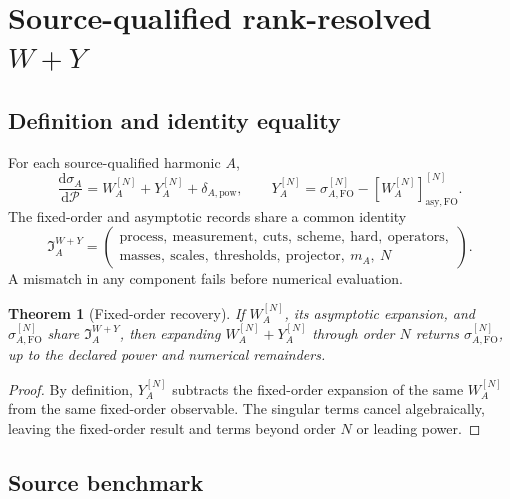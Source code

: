 \documentclass[11pt]{article}
\newtheorem{theorem}[definition]{Theorem}
\newcommand{\dd}{\mathrm{d}}
\newcommand{\cP}{\mathcal P}
\newcommand{\FO}{\ensuremath{\mathrm{FO}}}
\newcommand{\WY}{W\!+\!Y}
\begin{document}
\section{Source-qualified rank-resolved \texorpdfstring{\(W+Y\)}{W+Y}}
\label{sec:wy}

\subsection{Definition and identity equality}

For each source-qualified harmonic \(A\),
\begin{equation}
 \frac{\dd\sigma_A}{\dd\cP}
 =
 W_A^{[N]}
 +Y_A^{[N]}
 +\delta_{A,\mathrm{pow}},
 \qquad
 Y_A^{[N]}
 =
 \sigma_{A,\FO}^{[N]}
 -\left[W_A^{[N]}\right]_{\mathrm{asy,FO}}^{[N]}.
 \label{eq:source-wy}
\end{equation}
The fixed-order and asymptotic records share a common identity
\begin{equation}
 \mathfrak I_A^{\WY}
 =
 \left(
 \begin{gathered}
 \mathrm{process},\ \mathrm{measurement},\ \mathrm{cuts},\ \mathrm{scheme},\
 \mathrm{hard},\ \mathrm{operators},\\
 \mathrm{masses},\ \mathrm{scales},\ \mathrm{thresholds},\
 \mathrm{projector},\ m_A,\ N
 \end{gathered}
 \right).
 \label{eq:wy-identity}
\end{equation}
A mismatch in any component fails before numerical evaluation.

\begin{theorem}[Fixed-order recovery]
If \(W_A^{[N]}\), its asymptotic expansion, and \(\sigma_{A,\FO}^{[N]}\) share \(\mathfrak I_A^{\WY}\), then expanding \(W_A^{[N]}+Y_A^{[N]}\) through order \(N\) returns \(\sigma_{A,\FO}^{[N]}\), up to the declared power and numerical remainders.
\end{theorem}

\begin{proof}
By definition, \(Y_A^{[N]}\) subtracts the fixed-order expansion of the same \(W_A^{[N]}\) from the same fixed-order observable.  The singular terms cancel algebraically, leaving the fixed-order result and terms beyond order \(N\) or leading power.
\end{proof}

\subsection{Source benchmark}
\end{document}
